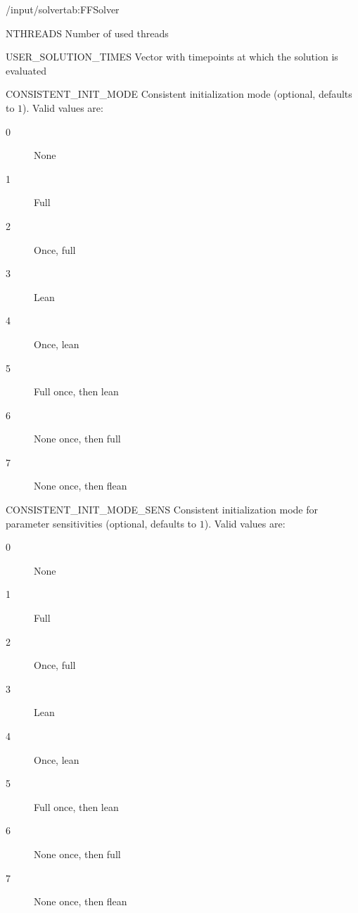 \begin{groupscope}{/input/solver}{tab:FFSolver}
  \begin{dataset}[type=int,range={$\geq 1$},length=1]{NTHREADS}
    Number of used threads
  \end{dataset}
  \begin{dataset}[type=double,unit={\si{\second}},range={$\geq 0$},length={Arbitrary}]{USER\_SOLUTION\_TIMES}
    Vector with timepoints at which the solution is evaluated
  \end{dataset}
  \begin{dataset}[type=int,range={$\{ 0, \dots, 7\}$},length=1]{CONSISTENT\_INIT\_MODE}
    Consistent initialization mode (optional, defaults to $1$).
    Valid values are:
    \begin{description}
      \item[0] None
      \item[1] Full
      \item[2] Once, full
      \item[3] Lean
      \item[4] Once, lean
      \item[5] Full once, then lean
      \item[6] None once, then full
      \item[7] None once, then flean
    \end{description}\vspace{-\baselineskip}
  \end{dataset}
  \begin{dataset}[type=int,range={$\{ 0, \dots, 7\}$},length=1]{CONSISTENT\_INIT\_MODE\_SENS}
    Consistent initialization mode for parameter sensitivities (optional, defaults to $1$).
    Valid values are:
    \begin{description}
      \item[0] None
      \item[1] Full
      \item[2] Once, full
      \item[3] Lean
      \item[4] Once, lean
      \item[5] Full once, then lean
      \item[6] None once, then full
      \item[7] None once, then flean
    \end{description}\vspace{-\baselineskip}
  \end{dataset}
\end{groupscope}

